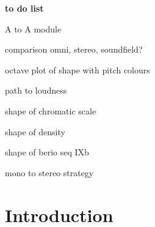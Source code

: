 \documentclass{article}
\title{\papertitle}
\begin{document}
%

\textbf{to do list}

\begin{compactitem}
	\item A to A module
	\item comparison omni, stereo, soundfield?
	\item octave plot of shape with pitch colours
	\item path to loudness
	\item shape of chromatic scale
	\item shape of density
	\item shape of berio seq IXb
	\item mono to stereo strategy
\end{compactitem}
\clearpage
%
\capstartfalse
\maketitle
\capstarttrue


\begin{abstract}

Place your abstract at the top left column on the first page.
Please write about 150--200 words that specifically highlight the purpose of your work,
its context, and provide a brief synopsis of your results.
Avoid equations in this part.

\end{abstract}


\section{Introduction}
\label{sec:intro}
\end{document}
